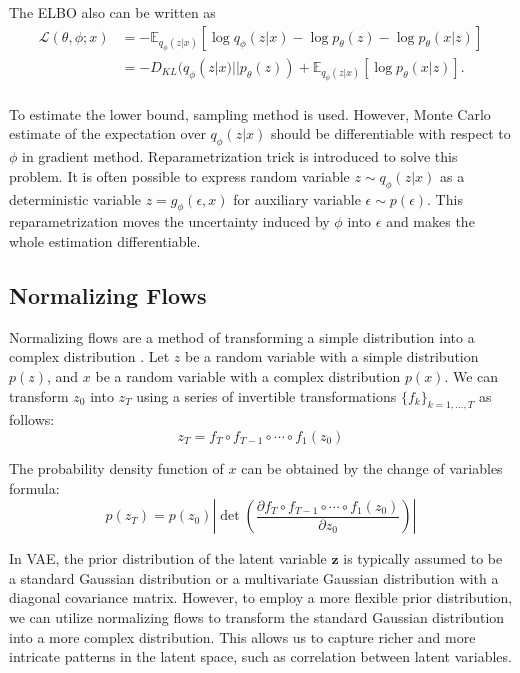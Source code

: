 \documentclass[10pt]{article}
\begin{document}
The ELBO also can be written as 
\begin{equation*}
	\begin{aligned}
		\mathcal{L}(\theta, \phi ; x) &= -\mathbb{E}_{q_{\phi}(z|x)}\left[ \log{q_{\phi}(z|x)} - \log{p_{\theta}(z)} - \log{p_{\theta}(x|z)}  \right] \\
		&= -D_{KL}( q_{\phi}(z|x) || p_{\theta}(z)) + \mathbb{E}_{q_{\phi}(z|x)}\left[ \log{p_{\theta}(x|z)}  \right]. \\
	\end{aligned}
\end{equation*}

To estimate the lower bound, sampling method is used. However, Monte Carlo estimate of the expectation over $q_{\phi}(z|x)$ should be differentiable with respect to $\phi$ in gradient method. Reparametrization trick is introduced to solve this problem. It is often possible to express random variable $z \sim q_{\phi}(z|x) $ as a deterministic variable $z = g_{\phi}(\epsilon, x)$ for auxiliary variable $\epsilon \sim p(\epsilon)$. This reparametrization moves the uncertainty induced by $\phi$ into $\epsilon$ and makes the whole estimation differentiable.

\subsection{Normalizing Flows}

Normalizing flows are a method of transforming a simple distribution into a complex distribution \cite{rezende15normalizingflows}. Let $z$ be a random variable with a simple distribution $p(z)$, and $x$ be a random variable with a complex distribution $p(x)$. We can transform $z_0$ into $z_T$ using a series of invertible transformations $\{f_k\}_{k=1,\ldots,T}$ as follows:
\begin{equation}
    z_T = f_T \circ f_{T-1} \circ \cdots \circ f_1(z_0)
\end{equation}

The probability density function of $x$ can be obtained by the change of variables formula:
\begin{equation}
    p(z_T) = p(z_0) \left| \det \left( \frac{\partial f_T \circ f_{T-1} \circ \cdots \circ f_1(z_0)}{\partial z_0} \right) \right|
\end{equation}

In VAE, the prior distribution of the latent variable $\mathbf{z}$ is typically assumed to be a standard Gaussian distribution or a multivariate Gaussian distribution with a diagonal covariance matrix. \cite{kingma2013auto} However, to employ a more flexible prior distribution, we can utilize normalizing flows to transform the standard Gaussian distribution into a more complex distribution. This allows us to capture richer and more intricate patterns in the latent space, such as correlation between latent variables.\\
\end{document}
